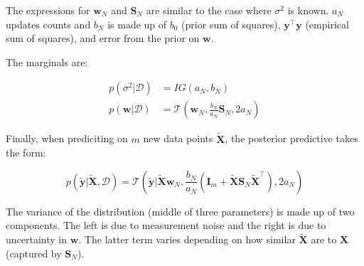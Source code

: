 \documentclass{harvardml}
\theoremstyle{definition}
\theoremstyle{plain}
\renewcommand{\v}[1]{\mathbf{#1}}
\begin{document}
\noindent The expressions for $\v w_N$ and $\v S_N$ are similar to 
the case where $\sigma^2$ is known. $a_N$ updates counts and $b_N$ 
is made up of $b_0$ (prior sum of squares), $\v y^\top \v y$
(empirical sum of squares), and error from the prior on $\v w$.

\noindent The marginals are:

\begin{align*}
    p(\sigma^2 | \mathcal{D}) &= IG(a_N,b_N)\\
    p(\v w | \mathcal{D}) &= \mathcal{T}(\v w_N, 
                             \frac{b_N}{a_N} \v S_N,
                             2a_N)
\end{align*}

\noindent Finally, when prediciting on $m$ new data points $\tilde{\v X}$,
the posterior predictive takes the form:

$$ p(\tilde{\v y} | \tilde{\v X}, \mathcal{D}) =
   \mathcal{T}(\tilde{\v y} | \tilde{\v X}\v w_N,
              \frac{b_N}{a_N}(\v I_m + \tilde{\v X} \v S_N \tilde{\v X}^\top),
              2a_N)$$

\noindent The variance of the distribution (middle of three parameters)
is made up of two components. The left is due to measurement noise
and the right is due to uncertainty in $\v w$. The latter term varies depending
on how similar $\tilde{\v X}$ are to $\v X$ (captured by $\v S_N$).
\end{document}
